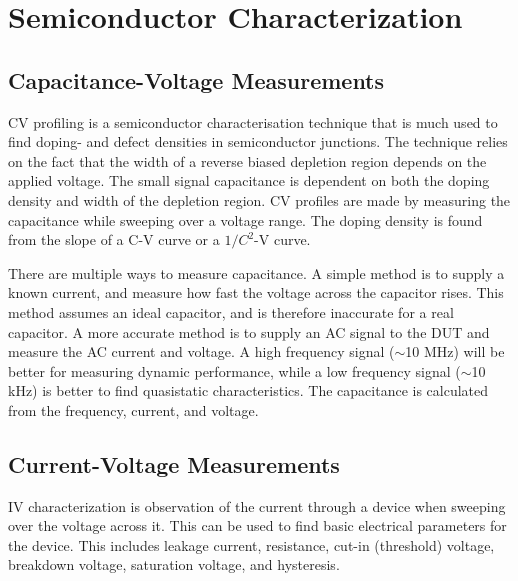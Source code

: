 \documentclass[../main/thesis.tex]{subfiles}
\begin{document}



\section{Semiconductor Characterization}
\label{t-char}

\subsection{Capacitance-Voltage Measurements}
\label{t-cv}
\gls{CV} profiling is a semiconductor characterisation technique that is much used to find doping- and defect densities in semiconductor junctions. The technique relies on the fact that the width of a reverse biased depletion region depends on the applied voltage. The small signal capacitance is dependent on both the doping density and width of the depletion region. \gls{CV} profiles are made by measuring the capacitance while sweeping over a voltage range. The doping density is found from the slope of a C-V curve or a $1/C^2$-V curve. \citep[chap. 2]{Schroder}

There are multiple ways to measure capacitance. A simple method is to supply a known current, and measure how fast the voltage across the capacitor rises. This method assumes an ideal capacitor, and is therefore inaccurate for a real capacitor. A more accurate method is to supply an AC signal to the \gls{DUT} and measure the AC current and voltage. A high frequency signal ($\sim$10 MHz) will be better for measuring dynamic performance, while a low frequency signal ($\sim$10 kHz) is better to find quasistatic characteristics. The capacitance is calculated from the frequency, current, and voltage. 


\subsection{Current-Voltage Measurements}
\label{t-iv}
\gls{IV} characterization is observation of the current through a device when sweeping over the voltage across it. This can be used to find basic electrical parameters for the device. This includes leakage current, resistance, cut-in (threshold) voltage, breakdown voltage, saturation voltage, and hysteresis. 
\end{document}
